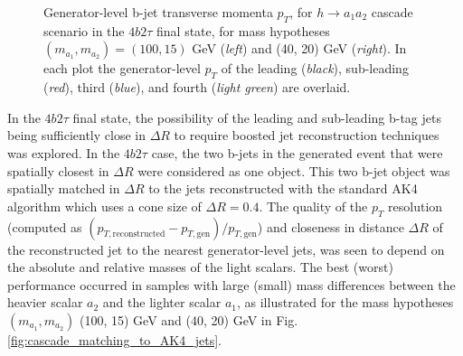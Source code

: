 \begin{figure}[h]
\begin{subfigure}{0.45\textwidth}
    \end{subfigure}  
    \caption{Generator-level b-jet transverse momenta $p_{T}$, for $h \rightarrow a_1 a_2$ cascade scenario in the $4b2\tau$ final state, for mass hypotheses $(m_{a_1}, m_{a_2}) = (100, 15)$ GeV (\textit{left}) and (40, 20) GeV (\textit{right}). In each plot the generator-level $p_{T}$ of the leading (\textit{black}), sub-leading (\textit{red}), third (\textit{blue}), and fourth (\textit{light green}) are overlaid.}
    \label{fig:overlay_cascade_b_jet_gen_pT}
\end{figure}


In the $4b2\tau$ final state, the possibility of the leading and sub-leading b-tag jets being sufficiently close in $\Delta R$ to require boosted jet reconstruction techniques was explored. In the $4b2\tau$ case, the two b-jets in the generated event that were spatially closest in $\Delta R$ were considered as one object. This two b-jet object was spatially matched in $\Delta R$ to the jets reconstructed with the standard AK4 algorithm which uses a cone size of $\Delta R = 0.4$. The quality of the $p_{T}$ resolution (computed as $(p_{T, \text{reconstructed}} - p_{T, \text{gen}})/ p_{T, \text{gen}}$) and closeness in distance $\Delta R$ of the reconstructed jet to the nearest generator-level jets, was seen to depend on the absolute and relative masses of the light scalars. The best (worst) performance occurred in samples with large (small) mass differences between the heavier scalar $a_2$ and the lighter scalar $a_1$, as illustrated for the mass hypotheses $(m_{a_1}, m_{a_2})$ (100, 15) GeV and (40, 20) GeV in Fig. \ref{fig:cascade_matching_to_AK4_jets}.


